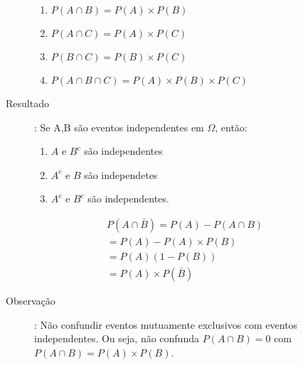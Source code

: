 \documentclass[11pt,a4paper]{book}
\begin{document}
\begin{description}
\begin{description}
      \begin{enumerate}[label=(\alph*)]
        \item $P(A \cap B) = P(A)\times P(B)$ 

        \item $P(A \cap C) = P(A)\times P(C)$

        \item $P(B \cap C)= P(B)\times P(C)$

        \item $P(A \cap B \cap C)= P(A)\times P(B) \times P(C)$
      \end{enumerate}

    \item [Resultado]: Se A,B são eventos independentes em $\Omega$, então:

      \begin{enumerate}[leftmargin=*, label=\Roman*., widest=IV, align=left]
        \item $A$ e $B^c$ são independentes
        \item $A^c$ e $B$ são independetes
        \item $A^c$ e $B^c$ são independentes.
      \end{enumerate}
      \begin{figure}
        \label{fig:19}
      \end{figure}

      \begin{align*}
        P(A \cap \bar{B})= P(A) - P(A \cap B)\\
        = P(A)-P(A)\times P(B)\\
        = P(A)(1-P(B))\\
        =P(A)\times P(\bar{B})
      \end{align*}

    \item [Observação]: Não confundir eventos mutuamente exclusivos com eventos independentes. Ou seja, não confunda $P(A \cap B)  = 0$ com $ P(A \cap B) = P(A)\times P(B)$.


\end{description}
\end{description}
\end{document}
